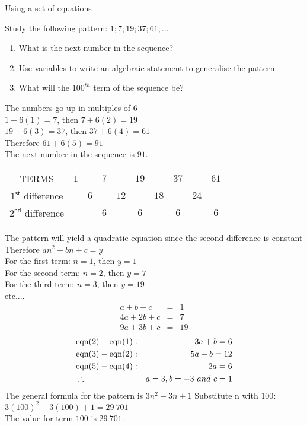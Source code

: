 \begin{wex}{Using a set of equations}
{Study the following pattern: $1; 7; 19; 37; 61; \ldots$
\begin{enumerate}
\item{What is the next number in the sequence?}
\item{Use variables to write an algebraic statement to generalise the pattern.}
\item{What will the $100^{th}$ term of the sequence be?}
\end{enumerate}
}{
The numbers go up in multiples of $6$\\
$1 + 6(1) = 7$,  then $7 + 6(2) = 19$\\
$19+ 6(3)=37$, then $37+6(4)=61$\\
Therefore $61 + 6(5) = 91$\\
The next number in the sequence is $91$.
\begin{center}
\begin{tabular}{cccccccccccc}
TERMS & $1$ && $7$ && $19$ && $37$ && $61$ & \\
$1^{\textsf{st}}$ difference && $6$ && $12$ && $18$ && $24$ \\ 
$2^{\textsf{nd}}$ difference &&& $6$ && $6$ && $6$ && $6$& \\
\end{tabular}
\end{center}
The pattern will yield a quadratic equation since the second difference is
constant\\
Therefore $an^2 + bn + c = y$\\
For the first term: $n = 1$,  then $y = 1$ \\
For the second term: $n = 2$, then $y = 7$ \\  
For the third term:  $n = 3$,  then $y = 19$ \\
etc....
\begin{eqnarray}
a+b+c &=& 1\\
4a + 2b + c &=& 7\\
9a + 3b + c &=& 19
\end{eqnarray}
\begin{eqnarray}
&\rm{eqn} (2) - \rm{eqn} (1):& 3a + b = 6\\
&\rm{eqn} (3) - \rm{eqn} (2):& 5a + b = 12\\
&\rm{eqn} (5) - \rm{eqn} (4):& 2a = 6\\
&\therefore & a = 3, b = -3 ~and~ c = 1
\end{eqnarray}
The general formula for the pattern is $3n^2 - 3n + 1$
Substitute n with $100$:\\
$3(100)^2 - 3(100) + 1 = 29~701$\\
The value for term $100$ is $29~701$.
}
\end{wex}

